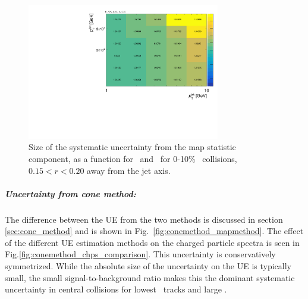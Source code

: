 \begin{figure}[h]
    \centerline{
       \includegraphics[width=0.75\textwidth]{figures/main/systematics/map_stat_size}
    }
    \caption{Size of the systematic uncertainty from the map statistic component, as a function for \pttrk\ and \ptjet\ for 0-10\% \pbpb\ collisions, $0.15 < r < 0.20$ away from the jet axis.}
    \label{fig:mapstat_corr}
 \end{figure}




\subparagraph{Uncertainty from cone method:} The difference between the UE from the two methods is discussed in section \ref{sec:cone_method} and is shown in Fig.~\ref{fig:conemethod_mapmethod}. The effect of the different UE estimation methods on the charged particle spectra is seen in Fig.\ref{fig:conemethod_chps_comparison}. This uncertainty is conservatively symmetrized. While the absolute size of the uncertainty on the UE is typically small, the small signal-to-background ratio makes this the dominant systematic uncertainty in central collisions for lowest \pT\ tracks and large \rvar.

